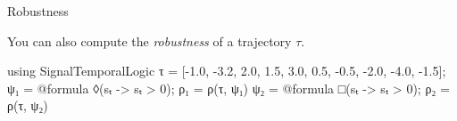 \begin{frame}[fragile,t]{Robustness}

\phantom{}

You can also compute the \textit{robustness} of a trajectory $\tau$.

\phantom{}

\begin{footnotesize}
\begin{juliaconsole}
using SignalTemporalLogic
τ = [-1.0, -3.2, 2.0, 1.5, 3.0, 0.5, -0.5, -2.0, -4.0, -1.5];
ψ₁ = @formula ◊(sₜ -> sₜ > 0);
ρ₁ = ρ(τ, ψ₁)
ψ₂ = @formula □(sₜ -> sₜ > 0);
ρ₂ = ρ(τ, ψ₂)
\end{juliaconsole}
\end{footnotesize}

\phantom{}

\pause\pause
{\footnotesize{}}

\pause
{\footnotesize{}}


\end{frame}